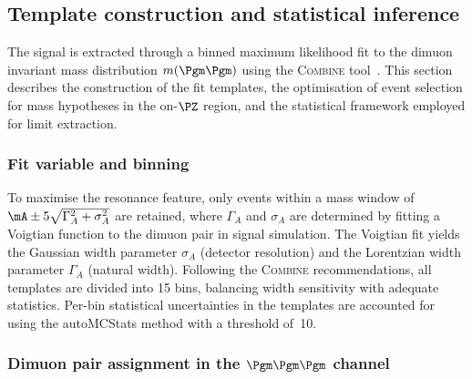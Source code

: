 \subsection{Template construction and statistical inference}
\label{ssec:templates}

The signal is extracted through a binned maximum likelihood fit to the dimuon invariant mass distribution $m(\Pgm\Pgm)$ using the \textsc{Combine} tool~\cite{combine_tool}. This section describes the construction of the fit templates, the optimisation of event selection for mass hypotheses in the on-$\PZ$ region, and the statistical framework employed for limit extraction.

\subsubsection{Fit variable and binning}

To maximise the resonance feature, only events within a mass window of $\mA \pm 5\sqrt{\Gamma_A^2 + \sigma_A^2}$ are retained, where $\Gamma_A$ and $\sigma_A$ are determined by fitting a Voigtian function to the dimuon pair in signal simulation. The Voigtian fit yields the Gaussian width parameter $\sigma_A$ (detector resolution) and the Lorentzian width parameter $\Gamma_A$ (natural width). Following the \textsc{Combine} recommendations, all templates are divided into 15 bins, balancing width sensitivity with adequate statistics. Per-bin statistical uncertainties in the templates are accounted for using the autoMCStats method with a threshold of~10.

\subsubsection{Dimuon pair assignment in the $\Pgm\Pgm\Pgm$ channel}

